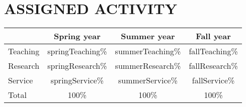 \section{ASSIGNED ACTIVITY}
\begin{center}
\begin{tabular}{lccc}

& Spring {{year}} & Summer {{year}} & Fall {{year}} 
 
\\
\hline
Teaching 
& {{springTeaching}}\%  & {{summerTeaching}}\% & {{fallTeaching}}\%

\\
Research 
& {{springResearch}}\% & {{summerResearch}}\% & {{fallResearch}}\%

\\
Service
& {{springService}}\% & {{summerService}}\% & {{fallService}}\%   

\\
\hline
Total & 100\% & 100\% & 100\%

\end{tabular}
\end{center}